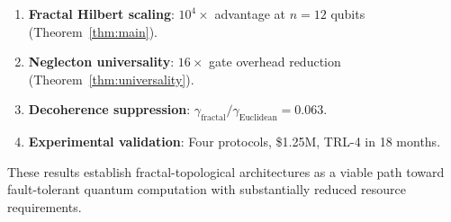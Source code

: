 \documentclass[aps,prx,twocolumn,superscriptaddress,showpacs,showkeys,floatfix]{revtex4-2}
\theoremstyle{plain}
\theoremstyle{definition}
\begin{document}
\begin{enumerate}
\item \textbf{Fractal Hilbert scaling}: $10^4\times$ advantage at $n = 12$ qubits (Theorem~\ref{thm:main}).
\item \textbf{Neglecton universality}: $16\times$ gate overhead reduction (Theorem~\ref{thm:universality}).
\item \textbf{Decoherence suppression}: $\gamma_{\mathrm{fractal}}/\gamma_{\mathrm{Euclidean}} = 0.063$.
\item \textbf{Experimental validation}: Four protocols, \$1.25M, TRL-4 in 18 months.
\end{enumerate}

These results establish fractal-topological architectures as a viable path toward fault-tolerant quantum computation with substantially reduced resource requirements.



\end{document}
